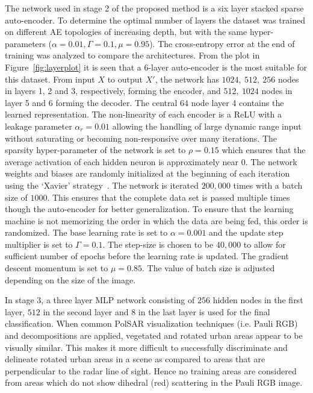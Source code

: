The network used in stage 2 of the proposed method is a six layer stacked sparse auto-encoder. To determine the optimal number of layers the dataset was trained on different AE topologies of increasing depth, but with the same hyper-parameters ($\alpha=0.01,\Gamma=0.1,\mu=0.95$). The cross-entropy error at the end of training was analyzed to compare the architectures. From the plot in Figure~\ref{fig:layerplot} it is seen that a 6-layer auto-encoder is the most suitable for this dataset. From input $X$ to output $X'$, the network has $1024,\ 512,\ 256$ nodes in layers 1, 2 and 3, respectively, forming the encoder, and $512,\ 1024$ nodes in layer 5 and 6 forming the decoder. The central $64$ node layer 4 contains the learned representation. The non-linearity of each encoder is a ReLU with a leakage parameter $\alpha_r = 0.01$ allowing the handling of large dynamic range input without saturating or becoming non-responsive over many iterations. The sparsity hyper-parameter of the network is set to $\rho = 0.15$ which ensures that the average activation of each hidden neuron  is approximately near 0. %
The network weights and biases are randomly initialized at the beginning of each iteration using the `Xavier' strategy~\cite{glorot2010understanding}.
The network is iterated $200,000$ times with a batch size of $1000$. This ensures that the complete data set is passed multiple times though the auto-encoder for better generalization. To ensure that the learning machine is not memorizing the order in which the data are being fed, this order is randomized. The base learning rate is set to $\alpha = 0.001$ and the update step multiplier is set to $\Gamma = 0.1$. The step-size is chosen to be $40,000$ to allow for sufficient number of epochs before the learning rate is updated. The gradient descent momentum is set to $\mu = 0.85$. The value of batch size is adjusted depending on the size of the image. 

In stage 3, a three layer MLP network consisting of  $256$ hidden nodes in the first layer, $512$ in the second layer and $8$ in the last layer is used for the final classification.
When common PolSAR visualization techniques (i.e. Pauli RGB) and decompositions are applied, vegetated and rotated urban areas appear to be visually similar. This makes it more difficult to successfully discriminate and delineate rotated urban areas in a scene as compared to areas that are perpendicular to the radar line of sight.  Hence no training areas are considered from areas which do not show dihedral (red) scattering in the Pauli RGB image. 

